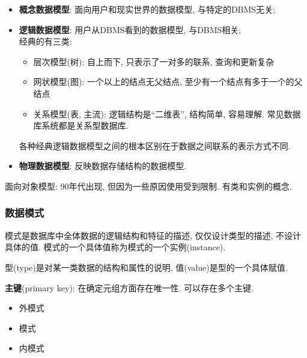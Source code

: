             \begin{itemize}
                \item \textbf{概念数据模型}: 面向用户和现实世界的数据模型, 与特定的DBMS无关;
                \item \textbf{逻辑数据模型}: 用户从DBMS看到的数据模型, 与DBMS相关; \\
                    经典的有三类: 
                    \begin{itemize}
                        \item 层次模型(树): 自上而下, 只表示了一对多的联系, 查询和更新复杂
                        \item 网状模型(图): 一个以上的结点无父结点, 至少有一个结点有多于一个的父结点
                        \item 关系模型(表, 主流): 逻辑结构是``二维表'', 结构简单, 容易理解. 常见数据库系统都是关系型数据库.
                    \end{itemize}
                    各种经典逻辑数据模型之间的根本区别在于数据之间联系的表示方式不同.
                \item \textbf{物理数据模型}: 反映数据存储结构的数据模型.
            \end{itemize}

            面向对象模型: 90年代出现, 但因为一些原因使用受到限制. 有类和实例的概念. 

        \subsubsection{数据模式}

            模式是数据库中全体数据的逻辑结构和特征的描述, 仅仅设计类型的描述, 不设计具体的值. 模式的一个具体值称为模式的一个实例(instance).

            型(type)是对某一类数据的结构和属性的说明, 值(value)是型的一个具体赋值.

            \textbf{主键}(primary key): 在确定元组方面存在唯一性. 可以存在多个主键.

            \begin{itemize}
                \item 外模式
                \item 模式
                \item 内模式
            \end{itemize}

